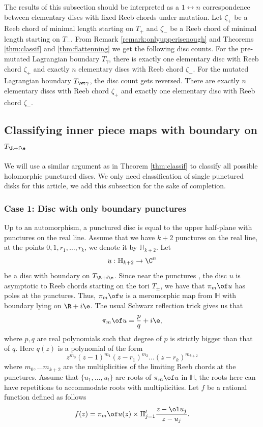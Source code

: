 \begin{remark}\label{remark:counting discs}
    The results of this subsection should be interpreted as a $1\longleftrightarrow n$ correspondence between elementary discs with fixed Reeb chords under mutation. Let $\zeta_+$ be a Reeb chord of minimal length starting on $T_+$ and $\zeta_-$ be a Reeb chord of minimal length starting on $T_-.$ From Remark \ref{remark:onlyupperisenough} and Theorems \ref{thm:classif} and \ref{thm:flattenning} we get the following disc counts. For the pre-mutated Lagrangian boundary $T_{\gamma}$, there is exactly one elementary disc with Reeb chord $\zeta_+$ and exactly $n$ elementary discs with Reeb chord $\zeta_-$. For the mutated Lagrangian boundary $T_{\wt \gamma}$, the disc count gets reversed. There are exactly $n$ elementary discs with Reeb chord $\zeta_+$ and exactly one elementary disc with Reeb chord $\zeta_-$.
\end{remark}




\subsection{Classifying inner piece maps with boundary on $T_{\R+i\e}$ }
We will use a similar argument as in Theorem \ref{thm:classif} to classify all possible holomorphic punctured discs. We only need classification of single punctured disks for this article, we add this subsection for the sake of completion.

\subsubsection{Case 1: Disc with only boundary punctures}

Up to an automorphism, a punctured disc is equal to the upper half-plane with punctures on the real line. Assume that we have $k+2$ punctures on the real line,   at the points $0,1,r_1,\dots,r_k$, we denote it by $\mathbb H_{k+2}$. Let $$u:\mathbb H_{k+2} \to  \C^n$$ be a disc with boundary on $T_{\R + i\e}$. Since near the punctures , the disc $u$ is asymptotic to Reeb chords starting on the tori $T_\pm$, we have that $\pi_m \of u$ has poles at the punctures. Thus, $\pi_m \of u $ is a meromorphic map from $\mathbb H$ with boundary lying on $\R+i\e$. The usual Schwarz reflection trick gives us that $$\pi_m \of u = \frac{p}{q} + i\e,$$ where $p,q$ are real polynomials such that degree of $p$ is strictly bigger than that of $q$. Here $q(z)$ is a polynomial of the form $$z^{m_0}(z-1)^{m_1}(z-r_1)^{m_2}\dots (z-r_k)^{m_{k+2}}$$ where $m_0,\dots m_{k+2}$ are the multiplicities of the limiting Reeb chords at the punctures. Assume that $\{u_1,\dots,u_l\}$ are roots of $\pi_m \of u$ in $\mathbb H$, the roots here can have repetitions to accommodate roots with multiplicities. Let $f$ be a rational function defined as follows $$ f(z) = \pi_m \of u(z) \times \Pi_{j=1}^l \frac{z-\ol u_j}{z-u_j}.$$


